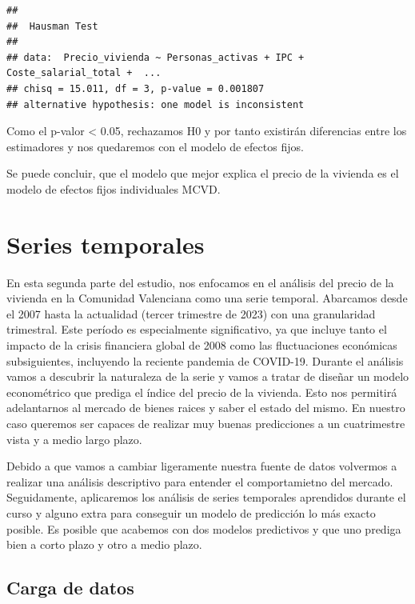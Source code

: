\documentclass[
]{article}
\begin{document}
\begin{verbatim}
## 
##  Hausman Test
## 
## data:  Precio_vivienda ~ Personas_activas + IPC + Coste_salarial_total +  ...
## chisq = 15.011, df = 3, p-value = 0.001807
## alternative hypothesis: one model is inconsistent
\end{verbatim}

Como el p-valor \textless{} 0.05, rechazamos H0 y por tanto existirán
diferencias entre los estimadores y nos quedaremos con el modelo de
efectos fijos.

Se puede concluir, que el modelo que mejor explica el precio de la
vivienda es el modelo de efectos fijos individuales MCVD.

\hypertarget{series-temporales}{%
\section{Series temporales}\label{series-temporales}}

En esta segunda parte del estudio, nos enfocamos en el análisis del
precio de la vivienda en la Comunidad Valenciana como una serie
temporal. Abarcamos desde el 2007 hasta la actualidad (tercer trimestre
de 2023) con una granularidad trimestral. Este período es especialmente
significativo, ya que incluye tanto el impacto de la crisis financiera
global de 2008 como las fluctuaciones económicas subsiguientes,
incluyendo la reciente pandemia de COVID-19. Durante el análisis vamos a
descubrir la naturaleza de la serie y vamos a tratar de diseñar un
modelo econométrico que prediga el índice del precio de la vivienda.
Esto nos permitirá adelantarnos al mercado de bienes raices y saber el
estado del mismo. En nuestro caso queremos ser capaces de realizar muy
buenas predicciones a un cuatrimestre vista y a medio largo plazo.

Debido a que vamos a cambiar ligeramente nuestra fuente de datos
volvermos a realizar una análisis descriptivo para entender el
comportamietno del mercado. Seguidamente, aplicaremos los análisis de
series temporales aprendidos durante el curso y alguno extra para
conseguir un modelo de predicción lo más exacto posible. Es posible que
acabemos con dos modelos predictivos y que uno prediga bien a corto
plazo y otro a medio plazo.

\hypertarget{carga-de-datos-1}{%
\subsection{Carga de datos}\label{carga-de-datos-1}}
\end{document}

